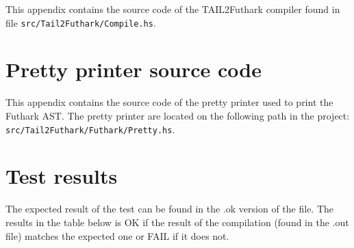 \documentclass[11pt]{article}
\begin{document}
This appendix contains the source code of the TAIL2Futhark compiler found in file {\tt src/Tail2Futhark/Compile.hs}. 


\section{Pretty printer source code}
\label{app:pretty}

This appendix contains the source code of the pretty printer used to print the Futhark AST. The pretty printer are located on the following path in the project: {\tt src/Tail2Futhark/Futhark/Pretty.hs}. 



\newpage

\section{Test results}
\label{app:testresults}
The expected result of the test can be found in the .ok version of the file. The results in the table below is OK if the result of the compilation (found in the .out file) matches the expected one or FAIL if it does not.
\end{document}
